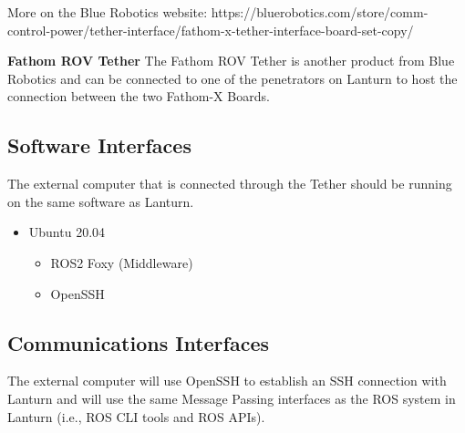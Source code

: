 More on the Blue Robotics website:
https://bluerobotics.com/store/comm-control-power/tether-interface/fathom-x-tether-interface-board-set-copy/
\par

\textbf{Fathom ROV Tether}
The Fathom ROV Tether is another product from Blue Robotics and can be
connected to one of the penetrators on Lanturn to host the connection between
the two Fathom-X Boards.
\par

\subsection{Software Interfaces}
\label{sec:software}

The external computer that is connected through the Tether should be running on
the same software as Lanturn. 

\begin{itemize}
    \item Ubuntu 20.04 
        \begin{itemize}
            \item ROS2 Foxy (Middleware) 
            \item OpenSSH
        \end{itemize}
\end{itemize}

\subsection{Communications Interfaces}
\label{sec:communications}

The external computer will use OpenSSH to establish an SSH connection with
Lanturn and will use the same Message Passing interfaces as the ROS system in
Lanturn (i.e., ROS CLI tools and ROS APIs).

